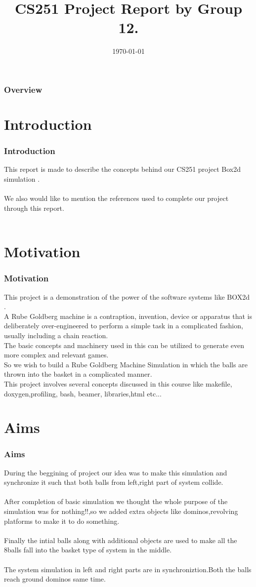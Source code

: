 \documentclass[t,compress,11pt,xcolor=dvipsnames]{beamer}
\title{ CS251 Project Report by Group 12.}
\author[Pramod  \&  Basith \& Nikhileswar  ]
{
   \texorpdfstring{
        \begin{columns}
            \column{.30\linewidth}
            \centering
            Pramod \\
            140050076 \\
            {140050076@itb.ac.in}
            \column{.30\linewidth}
            \centering
            Basith \\
             140050070 \\
             {140050070@itb.ac.in}
            \column{.30\linewidth}
            \centering
            Nikhileswar \\
             140050074 \\
            {140050074@itb.ac.in}
        \end{columns}
   }
   {John Doe \& Jane Doe}
   }
\date{\today}
\begin{document}
\maketitle
\begin{frame}
\frametitle{Overview}
\tableofcontents
\end{frame}
\section{Introduction}
\begin{frame}
\frametitle{Introduction}
This report is made to describe the concepts behind our CS251 project Box2d simulation .\\~\\
We also would like to mention the references used to complete our project through this report.\\~\\
\end{frame}
%
\section{Motivation}
\begin{frame}
\frametitle{Motivation}
This project is a demonstration of the power of the software
systems like BOX2d .\\
A Rube Goldberg\cite{goldberg} machine is a contraption, invention, device or apparatus that is deliberately over-engineered to perform a simple task in a complicated fashion, usually including a chain reaction.\\
The basic concepts and machinery used in this can be utilized to generate even more complex and relevant games.\\
So we wish to build a Rube Goldberg Machine \cite{machine}  Simulation in which the balls are thrown into the basket in a complicated manner.  \\
This project involves several concepts discussed in this course like
makefile, doxygen,profiling, bash, beamer, libraries,html etc...\\
\end{frame}
\section{Aims}
\begin{frame}
\frametitle{Aims}
During the beggining of project our idea was to make this simulation and synchronize it such that both balls from left,right part of system collide. \\~\\
After completion of basic simulation we thought the whole purpose of the simulation was for nothing!!,so we added extra objects like dominos,revolving platforms to make it to do something.\\~\\
Finally the intial balls along with additional objects are  used to make all the 8balls fall into the basket type of system in the middle.\\~\\
The system simulation in left and right parts are in synchroniztion.Both the balls reach ground dominos same time.
\end{frame}
\end{document}
